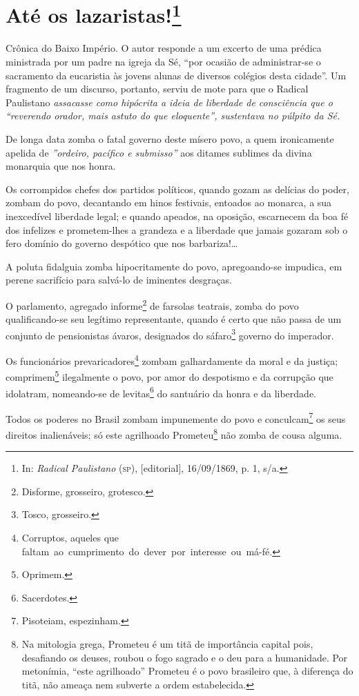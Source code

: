 \chapter{Até os lazaristas!\footnote{In: \emph{Radical Paulistano} (\textsc{sp}),
  {[}editorial{]}, 16/09/1869, p. 1, s/a.}}

\begin{didascalia}
Crônica do Baixo Império. O autor responde a um excerto de uma prédica
ministrada por um padre na igreja da Sé, ``por ocasião de administrar-se
o sacramento da eucaristia às jovens alunas de diversos colégios desta
cidade''. Um fragmento de um discurso, portanto, serviu de mote para que
o Radical Paulistano \emph{assacasse como hipócrita a ideia de liberdade
de consciência que o ``reverendo orador, mais astuto do que eloquente'',
sustentava no púlpito da Sé.}
\end{didascalia}



De longa data zomba o fatal governo deste mísero povo, a quem
ironicamente apelida de \emph{''ordeiro, pacífico e submisso''} aos
ditames sublimes da divina monarquia que nos honra.

Os corrompidos chefes dos partidos políticos, quando gozam as delícias
do poder, zombam do povo, decantando em hinos festivais, entoados ao
monarca, a sua inexcedível liberdade legal; e quando apeados, na
oposição, escarnecem da boa fé dos infelizes e prometem-lhes a grandeza
e a liberdade que jamais gozaram sob o fero domínio do governo despótico
que nos barbariza!\ldots{}

A poluta fidalguia zomba hipocritamente do povo, apregoando-se impudica,
em perene sacrifício para salvá-lo de iminentes desgraças.

O parlamento, agregado informe\footnote{Disforme, grosseiro, grotesco.}
de farsolas teatrais, zomba do povo qualificando-se seu legítimo
representante, quando é certo que não passa de um conjunto de
pensionistas ávaros, designados do sáfaro\footnote{Tosco, grosseiro.}
governo do imperador.

Os funcionários prevaricadores\footnote{Corruptos, aqueles que
  faltam~ao~cumprimento~do~dever~por~interesse~ou~má-fé.} zombam
galhardamente da moral e da justiça; comprimem\footnote{Oprimem.}
ilegalmente o povo, por amor do despotismo e da corrupção que idolatram,
nomeando-se de levitas\footnote{Sacerdotes.} do santuário da honra e
da liberdade.

Todos os poderes no Brasil zombam impunemente do povo e
conculcam\footnote{Pisoteiam, espezinham.} os seus direitos
inalienáveis; só este agrilhoado Prometeu\footnote{Na mitologia grega,
  Prometeu é um titã de importância capital pois, desafiando os deuses,
  roubou o fogo sagrado e o deu para a humanidade. Por metonímia, ``este
  agrilhoado'' Prometeu é o povo brasileiro que, à diferença do titã, não
  ameaça nem subverte a ordem estabelecida.} não zomba de cousa alguma.

